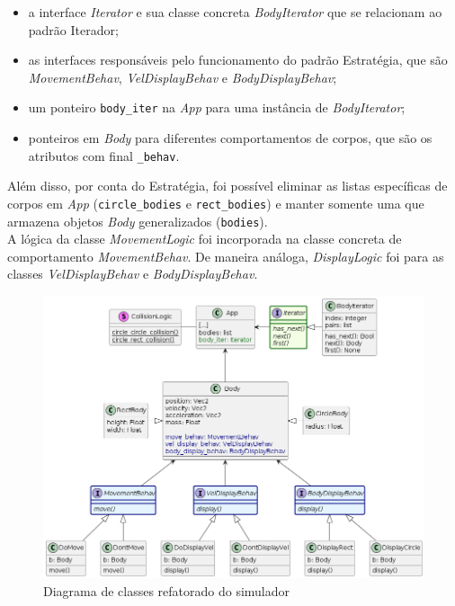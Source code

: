 \documentclass[11pt]{article}
\begin{document}
\begin{itemize}
    \item a interface \textit{Iterator} e sua classe concreta \textit{BodyIterator} que se relacionam ao padrão Iterador;
    \item as interfaces responsáveis pelo funcionamento do padrão Estratégia, que são \textit{MovementBehav}, \textit{VelDisplayBehav} e \textit{BodyDisplayBehav};
    \item um ponteiro \verb|body_iter| na \textit{App} para uma instância de \textit{BodyIterator};
    \item ponteiros em \textit{Body} para diferentes comportamentos de corpos, que são os atributos com final \verb|_behav|.
\end{itemize}

Além disso, por conta do Estratégia, foi possível eliminar as listas específicas de corpos em \textit{App} (\verb|circle_bodies| e \verb|rect_bodies|) e manter somente uma que armazena objetos \textit{Body} generalizados (\verb|bodies|). \\

A lógica da classe \textit{MovementLogic} foi incorporada na classe concreta de comportamento \textit{MovementBehav}. De maneira análoga, \textit{DisplayLogic} foi para as classes \textit{VelDisplayBehav} e \textit{BodyDisplayBehav}.

 \begin{figure}[h]
    \centering
    \includegraphics[scale=0.60]{figuras/diagr_refeito_simplificado.png}
    \caption{Diagrama de classes refatorado do simulador}
    \label{fig:diagr_refatorado}
 \end{figure} 
\end{document}
